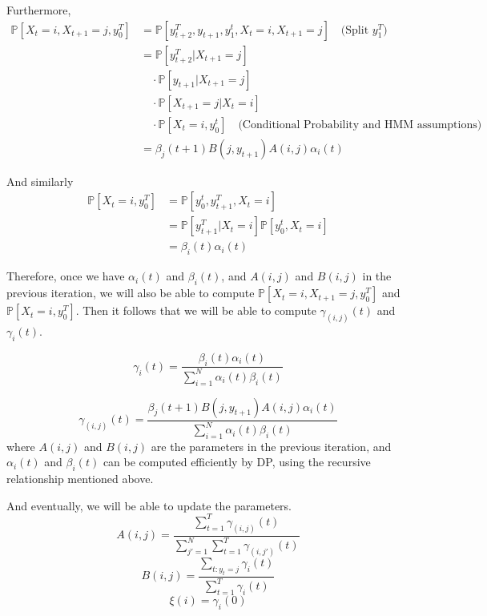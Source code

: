         Furthermore,
        \begin{align*}
            \mathbb{P}[X_t=i,X_{t+1}=j, y_0^T] &= \mathbb{P}[y_{t+2}^T, y_{t+1}, y_1^t, X_t=i, X_{t+1}=j] \quad \text{(Split $y_1^T$)}\\
            &= \mathbb{P}[y_{t+2}^T|X_{t+1}=j]\\
            &\quad \cdot \mathbb{P}[y_{t+1}|X_{t+1}=j]\\
            &\quad \cdot \mathbb{P}[X_{t+1}=j|X_t=i]\\
            &\quad \cdot \mathbb{P}[X_t=i, y_0^t] \quad \text{(Conditional Probability and HMM assumptions)}\\
            &= \beta_j(t+1)B(j,y_{t+1})A(i,j)\alpha_i(t)
        \end{align*}
    
        And similarly
        \begin{align*}
            \mathbb{P}[X_t=i, y_0^T] &= \mathbb{P}[y_0^{t}, y_{t+1}^T, X_t=i]\\
            &= \mathbb{P}[y_{t+1}^T|X_t=i]\mathbb{P}[y_0^t, X_t=i]\\
            &= \beta_i(t)\alpha_i(t)
        \end{align*}
    
        Therefore, once we have $\alpha_i(t)$ and $\beta_i(t)$, and $A(i,j)$ and $B(i,j)$ in the previous iteration, we will also be able to compute $\mathbb{P}[X_t=i, X_{t+1}=j, y_0^T]$ and $\mathbb{P}[X_t=i,y_0^T]$. Then it follows that we will be able to compute $\gamma_{(i,j)}(t)$ and $\gamma_i(t)$.
    
        \[ \gamma_i(t) = \frac{\beta_i(t)\alpha_i(t)}{\sum_{i=1}^N \alpha_i(t)\beta_i(t)} \]
    
        \[ \gamma_{(i,j)}(t) = \frac{\beta_j(t+1)B(j,y_{t+1})A(i,j)\alpha_i(t)}{\sum_{i=1}^N \alpha_i(t)\beta_i(t)} \]
        where $A(i,j)$ and $B(i,j)$ are the parameters in the previous iteration, and $\alpha_i(t)$ and $\beta_i(t)$ can be computed efficiently by DP, using the recursive relationship mentioned above.
    
        And eventually, we will be able to update the parameters.
        \[ A(i,j) = \frac{\sum_{t=1}^T \gamma_{(i,j)}(t)}{\sum_{j'=1}^N\sum_{t=1}^T\gamma_{(i,j')}(t)} \]
        \[ B(i,j) = \frac{\sum_{t:y_t=j}\gamma_i(t)}{\sum_{t=1}^T\gamma_i(t)} \]
        \[ \xi(i) = \gamma_i(0) \]
